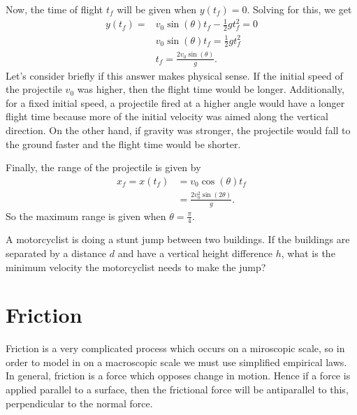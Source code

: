 \documentclass[../classical_mechanics.tex]{subfiles}
\begin{document}
        Now, the time of flight $t_f$ will be given when $y(t_f)=0$.
        Solving for this, we get
        \begin{align}
            y(t_f) = &v_0\sin(\theta)t_f - \frac{1}{2}gt_f^2 = 0\\
            &v_0\sin(\theta)t_f = \frac{1}{2}gt_f^2\\
            &t_f = \frac{2v_0\sin(\theta)}{g}.
        \end{align}
        Let's consider briefly if this answer makes physical sense.
        If the initial speed of the projectile $v_0$ was higher, then the flight time would be longer.
        Additionally, for a fixed initial speed, a projectile fired at a higher angle would have a longer flight time because more of the initial velocity was aimed along the vertical direction.
        On the other hand, if gravity was stronger, the projectile would fall to the ground faster and the flight time would be shorter.

        Finally, the range of the projectile is given by
        \begin{align}
            x_f = x(t_f) &= v_0\cos(\theta)t_f\\
            &= \frac{2v_0^2\sin(2\theta)}{g}.
        \end{align}
        So the maximum range is given when $\theta=\frac{\pi}{4}$.


        \begin{example}
            A motorcyclist is doing a stunt jump between two buildings.
            If the buildings are separated by a distance $d$ and have a vertical height difference $h$, what is the minimum velocity the motorcyclist needs to make the jump?
        \end{example}

    \section{Friction}\label{sec:friction}
        Friction is a very complicated process which occurs on a miroscopic scale, so in order to model in on a macroscopic scale we must use simplified empirical laws.
        In general, friction is a force which opposes change in motion. Hence if a force is applied parallel to a surface, then the frictional force will be antiparallel to this, perpendicular to the normal force.
\end{document}

